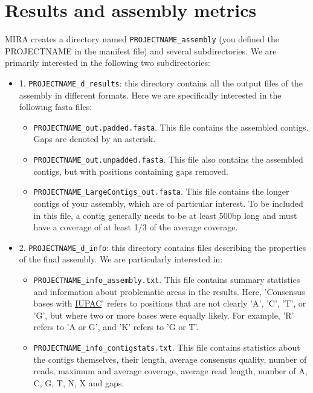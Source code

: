 \documentclass[11pt]{article}
\begin{document}
\section{Results and assembly metrics}
\label{sec-2}

MIRA creates a directory named \texttt{PROJECTNAME\_assembly} (you defined the
PROJECTNAME in the manifest file) and several subdirectories. We are
primarily interested in the following two subdirectories:
\begin{itemize}
\item 1. \texttt{PROJECTNAME\_d\_results}: this directory contains all the output
files of the assembly in different formats. Here we are specifically
interested in the following fasta files:
\begin{itemize}
\item \texttt{PROJECTNAME\_out.padded.fasta}. This file contains the assembled contigs. Gaps are denoted by an asterisk.
\item \texttt{PROJECTNAME\_out.unpadded.fasta}. This file also contains
the assembled contigs, but with positions containing gaps removed.
\item \texttt{PROJECTNAME\_LargeContigs\_out.fasta}. This file contains the longer contigs of
your assembly, which are of particular interest. To be included in
this file, a contig generally needs to be at least 500bp long and
must have a coverage of at least 1/3 of the average coverage.
\end{itemize}
\item 2. \texttt{PROJECTNAME\_d\_info}: this directory contains files describing the properties of
the final assembly. We are particularly interested in:
\begin{itemize}
\item \texttt{PROJECTNAME\_info\_assembly.txt}. This file contains
summary statistics and information about problematic areas in the
results. Here, 'Consensus bases with \href{http://www.bioinformatics.org/sms/iupac.html}{IUPAC}' refers to positions
that are not clearly 'A', 'C', 'T', or 'G', but where two or more
bases were equally likely. For example, 'R' refers to 'A or G', and
'K' refers to 'G or T'.
\item \texttt{PROJECTNAME\_info\_contigstats.txt}. This file
contains statistics about the contigs themselves, their length,
average consensus quality, number of reads, maximum and average
coverage, average read length, number of A, C, G, T, N, X and gaps.
\end{itemize}
\end{itemize}
\end{document}
